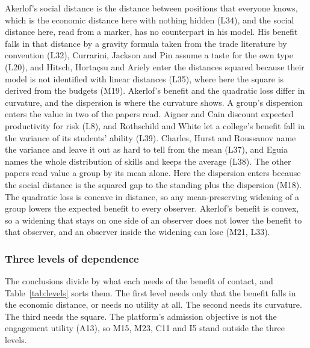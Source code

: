 Akerlof's social distance is the distance between positions that everyone
knows, which is the economic distance here with nothing hidden (L34), and
the social distance here, read from a marker, has no counterpart in his
model. His benefit falls in that distance by a gravity formula taken from
the trade literature by convention (L32), Currarini, Jackson and Pin assume
a taste for the own type (L20), and Hitsch, Horta\c{c}su and Ariely enter
the distances squared because their model is not identified with linear
distances (L35), where here the square is derived from the budgets (M19).
Akerlof's benefit and the quadratic loss differ in curvature, and the
dispersion is where the curvature shows. A group's dispersion enters the
value in two of the papers read. Aigner and Cain discount expected
productivity for risk (L8), and Rothschild and White let a college's
benefit fall in the variance of its students' ability (L39). Charles, Hurst
and Roussanov name the variance and leave it out as hard to tell from the
mean (L37), and Eguia names the whole distribution of skills and keeps the
average (L38). The other papers read value a group by its mean alone. Here
the dispersion enters because the social distance is the squared gap to the
standing plus the dispersion (M18). The quadratic loss is concave in
distance, so any mean-preserving widening of a group lowers the expected
benefit to every observer. Akerlof's benefit is convex, so a widening that
stays on one side of an observer does not lower the benefit to that
observer, and an observer inside the widening can lose (M21, L33).

\subsubsection{Three levels of dependence}

The conclusions divide by what each needs of the benefit of contact, and
Table~\ref{tab:levels} sorts them. The first level needs only that the
benefit falls in the economic distance, or needs no utility at all. The
second needs its curvature. The third needs the square. The platform's
admission objective is not the engagement utility (A13), so M15, M23, C11 and I5
stand outside the three levels.

